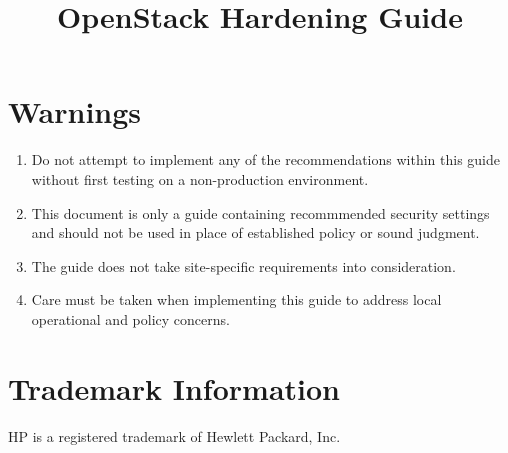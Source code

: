 \title{OpenStack Hardening Guide}

\chapter{Warnings}
\begin{enumerate}
\item Do not attempt to implement any of the recommendations within this guide without first testing on a non-production environment.
\item This document is only a guide containing recommmended security settings and should not be used in place of established policy or sound judgment.
\item The guide does not take site-specific requirements into consideration. 
\item Care must be taken when implementing this guide to address local operational and policy concerns.
\end{enumerate}
\chapter{Trademark Information}
HP is a registered trademark of Hewlett Packard, Inc.
